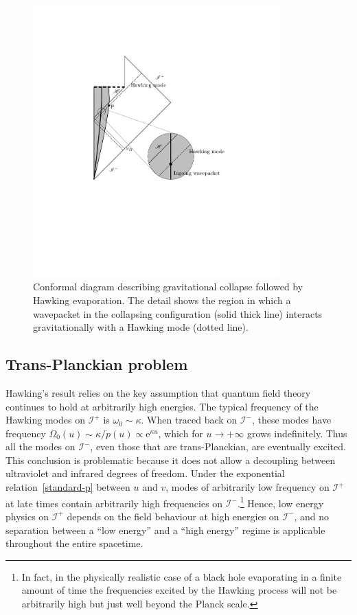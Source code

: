 \documentclass[prd,groupedaddress, showpacs, showkeys, onecolumn, nofootinbib, 12pt]{revtex4-2}
\def\e{{\mathrm e}}%
\newcommand{\scri}{\mathscr{I}}
\begin{document}
%
\begin{figure}[tb]
\begin{center}
\includegraphics[width=9.5cm]{figura.pdf}
\end{center}
\caption{Conformal diagram describing gravitational collapse followed by Hawking evaporation.  The detail shows the region in which a wavepacket in the collapsing configuration (solid thick line) interacts gravitationally with a Hawking mode (dotted line).}
\label{figure1}
\end{figure}
%

\subsection{Trans-Planckian problem}
\label{subsec:tP}

Hawking's result relies on the key assumption that quantum field theory continues to hold at arbitrarily high energies.  The typical frequency of the Hawking modes on $\scri^+$ is $\omega_0\sim\kappa$.  When traced back on $\scri^-$, these modes have frequency $\Omega_0(u)\sim\kappa/\dot{p}(u) \propto \e^{\kappa u}$, which for $u\rightarrow +\infty$ grows indefinitely.  Thus all the modes on $\scri^-$, even those that are trans-Planckian, are eventually excited.  This conclusion is problematic because it does not allow a decoupling between ultraviolet and infrared degrees of freedom.  Under the exponential relation~\eqref{standard-p} between $u$ and $v$, modes of arbitrarily low frequency on $\scri^+$ at late times contain arbitrarily high frequencies on $\scri^-$.\footnote{ In fact, in the physically realistic case of a black hole evaporating in a finite amount of time the frequencies excited by the Hawking process will not be arbitrarily high but  just well beyond the Planck scale.}  Hence, low energy physics on $\scri^+$ depends on the field behaviour at high energies on $\scri^-$, and no separation between a ``low energy'' and a ``high energy'' regime is applicable throughout the entire  spacetime.  
\end{document}
